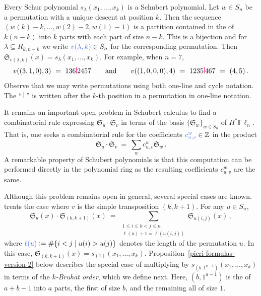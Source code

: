 \documentclass[12pt,oneside,reqno]{amsart}
\theoremstyle{definition}
\numberwithin{equation}{section}
\newcommand{\Fln}{{\mathbb F}\ell_n}
\newcommand{\ZZ}{{\mathbb Z}}
\newcommand{\frakS}{{\mathfrak S}}
\newcommand{\ptsp}{\hspace{0.55pt}}
\newcommand{\p}{\raisebox{-0.5pt}{\ptsp\color{magenta}\rule{0.75pt}{9pt}}\ptsp}  %
\newcommand{\defcolor}[1]{{\color{RoyalBlue}#1}}
\newcommand{\demph}[1]{\defcolor{{\sl #1}}}
\begin{document}
Every Schur polynomial $s_\lambda(x_1, \ldots, x_k)$ is a Schubert polynomial.
Let $w\in S_n$ be a permutation with a unique descent at position $k$.
Then the sequence $(w(k){-}k,\dotsc, w(2){-}2,w(1){-}1)$ is a partition contained in the \demph{rectangular
partition $R_{k,n-k}$} of $k(n{-}k)$ into $k$ parts with each part of
size $n{-}k$.
This is a bijection and
for $\lambda \subseteq R_{k, n-k}$ we write $\defcolor{v(\lambda,k)}\in S_n$ for
the corresponding permutation.
Then $\frakS_{v(\lambda, k)}(x) = s_\lambda(x_1, \ldots, x_k)$.
For example, when $n=7$,  %
%
\begin{equation}
  v((3,1,0),3)\ =\ 136\p2457
  \qquad\mbox{and}\qquad
  v((1,0,0,0),4)\ =\ 1235\p467\ =\ (4,5)\,.
\end{equation}
%
Observe that we may write permutations using both one-line and cycle notation.
The ``\,$\p$\,'' is written after the $k$-th position in a permutation in one-line notation.
  
It remains an important open problem in Schubert calculus to
find a combinatorial rule expressing $\frakS_u \cdot \frakS_v$
in terms of the basis $\{ \frakS_w \}_{w \in S_n}$ of $H^*\Fln$.
That is, one seeks a combinatorial rule for the coefficients
$\defcolor{c_{u,v}^{w}}\in\ZZ$ in the product
%
\begin{equation}
    \label{eq:classical-coeffs}
    \frakS_u \cdot \frakS_v\ =\ \sum_{w} c_{u, v}^{w} \frakS_w\,.
\end{equation}
%
A remarkable property of Schubert polynomials is that this computation can
be performed directly in the polynomial ring as the resulting coefficients
$c_{u, v}^w$ are the same.

Although this problem remains open in general, several special cases are known.
\demph{Monk's Formula}~\cite{Monk} treats the case where $v$ is the simple transposition $(k, k{+}1)$.
For any $u \in S_n$,
%
  \begin{equation}
    \label{classical-Monk-formula}
    \frakS_u(x) \cdot \frakS_{(k,k+1)}(x)
       \ =\ 
    \sum_{\substack{1 \leq i \leq k < j \leq n \\ \ell(u) + 1 = \ell(u(i,j))}} \frakS_{u (i,j)}(x)\,,
 \end{equation}
%
where $\defcolor{\ell(u)}\vcentcolon=\#\{i<j\mid u(i)>u(j)\}$ denotes the length of the permutation $u$.
In this case, $\frakS_{(k, k+1)}(x) = s_{(1)}(x_1, \ldots, x_k)$.
Proposition~\ref{pieri-formulas-version-2} below describes the special case of
multiplying by $s_{(b, 1^{a-1})}(x_1, \ldots, x_k)$
in terms of the \emph{$k$-Bruhat order}, which we define next.
Here, $(b,1^{a-1})$ is the \demph{hook partition} of $a{+}b{-}1$ into $a$ parts, the first of size $b$, and the remaining all of size $1$.
\end{document}
